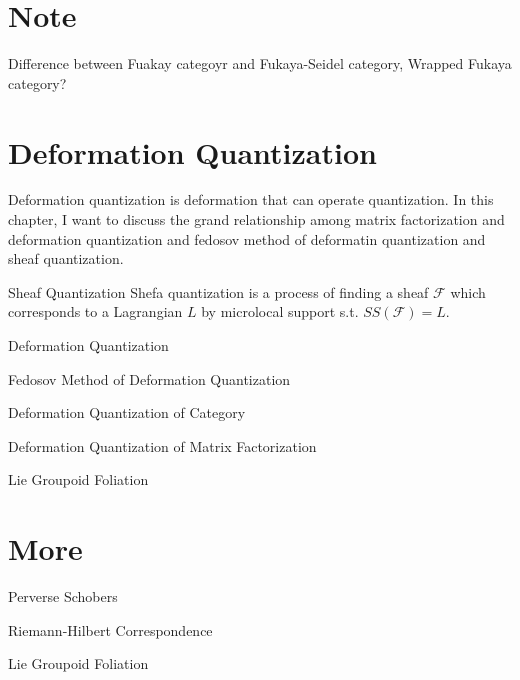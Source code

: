 \documentclass{article}
\begin{document}
\section {Note}

\noindent
Difference between Fuakay categoyr and Fukaya-Seidel category, Wrapped Fukaya category?

\section {Deformation Quantization}

\noindent
Deformation quantization is deformation that can operate quantization.
In this chapter, I want to discuss the grand relationship among matrix factorization and deformation quantization 
and fedosov method of deformatin quantization and sheaf quantization. \\

\noindent



\begin{definition}{Sheaf Quantization}{}
Shefa quantization is a process of finding a sheaf $\mathcal{F}$ which corresponds to a Lagrangian $L$ by microlocal support 
s.t. $SS(\mathcal{F}) = L$.
\end{definition}


\begin{definition}{Deformation Quantization}{}
\end{definition}


\begin{definition}{Fedosov Method of Deformation Quantization}{}
\end{definition}


\begin{definition}{Deformation Quantization of Category}{}
\end{definition}


\begin{definition}{Deformation Quantization of Matrix Factorization}{}
\end{definition}


\begin{definition}{Lie Groupoid Foliation}{}
\end{definition}


\begin{definition}{}{}
\end{definition}


\section {More}

\begin{definition}{Perverse Schobers}{}
\end{definition}


\begin{definition}{Riemann-Hilbert Correspondence}{}
\end{definition}


\begin{definition}{Lie Groupoid Foliation}{}
\end{definition}



\nocite{*}
\printbibliography
\end{document}
